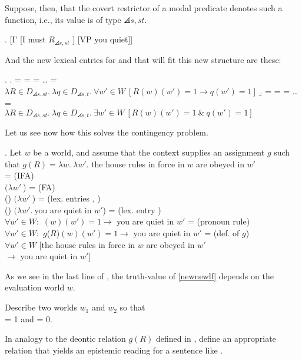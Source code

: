 Suppose, then, that the covert restrictor of a modal predicate denotes such a function, i.e., its value is of type $\angles{s,st}$.

\exi. \label{newnewlf} [I' [I must $R_{\angles{s,st}}$ ] [VP you quiet]]

And the new lexical entries for  and  that will fit this new structure are these:

\ex. \a.  =  =  = \dots{} =\\
$\lambda R\in D_{\angles{s,st}}.\ \lambda q\in D_{\angles{s,t}}.\ \forall w'\in W\ [R(w)(w') =1 \rightarrow q(w')=1]$
\b.  =  =  = \dots{} =\\
$\lambda R\in D_{\angles{s,st}}.\ \lambda q\in D_{\angles{s,t}}.\ \exists w'\in W\ [R(w)(w')=1\ \&\ q(w')=1]$

Let us see now how this solves the contingency problem. 

\ex. Let $w$ be a world, and assume that the context supplies an assignment $g$ such that $g(R) = \lambda w.\ \lambda w'.$ the house rules in force in $w$ are obeyed in $w'$\\[9pt]
 = \hfill{\tiny (IFA)}\\
$(\lambda w'\ $) = \hfill{\tiny (FA)}\\
 () $(\lambda w'\ $) = \hfill{\tiny (lex. entries , )}\\
 () $(\lambda w'.\ $you are quiet in $w'$) = \hfill{\tiny (lex. entry )}\\
$\forall w'\in W:$ $(w)(w') =1 \rightarrow $ you are quiet in $w'$ = \hfill{\tiny (pronoun rule)}\\
$\forall w'\in W:$ $g$({$R$})$(w)(w') =1 \rightarrow $ you are quiet in $w'$ = \hfill{\tiny (def. of $g$)}\\
$\forall w'\in W$ [the house rules in force in $w$ are obeyed in $w'$ \\
\null\hfill $\rightarrow$ you are quiet in $w'$]

As we see in the last line of \Last, the truth-value of \ref{newnewlf} depends on the evaluation world $w$.
\begin{exercise}
	
	Describe two worlds $w_{1}$ and $w_{2}$ so that\\
	 = 1 and  = 0. \eex
\end{exercise}
\begin{exercise}
	
	In analogy to the deontic relation $g(R)$ defined in \Last, define an appropriate relation that yields an epistemic reading for a sentence like . \eex 
\end{exercise}

